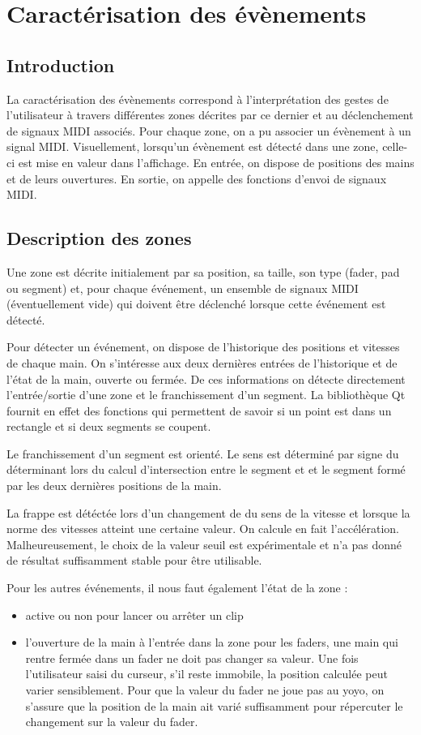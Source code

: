 \section{Caractérisation des évènements}
\subsection{Introduction}
\par La caractérisation des évènements correspond à l'interprétation des gestes de l'utilisateur à travers différentes zones décrites par ce dernier et au déclenchement de signaux MIDI associés. Pour chaque zone, on a pu associer un évènement à un signal MIDI. Visuellement, lorsqu'un évènement est détecté dans une zone, celle-ci est mise en valeur dans l'affichage. En entrée, on dispose de positions des mains et de leurs ouvertures. En sortie, on appelle des fonctions d'envoi de signaux MIDI.
\subsection{Description des zones}
\par  Une zone est décrite initialement par sa position, sa taille, son type  (fader, pad ou segment) et, pour chaque événement, un ensemble de  signaux MIDI (éventuellement vide) qui doivent être déclenché lorsque cette événement est détecté.
\par  Pour détecter un événement, on dispose de l'historique des positions et vitesses de chaque main. On s'intéresse aux deux dernières entrées de l'historique et de l'état de la main, ouverte ou fermée. De ces informations on détecte directement l'entrée/sortie d'une zone et le franchissement d'un segment. La bibliothèque Qt fournit en effet des fonctions qui permettent de savoir si un point est dans un rectangle et si deux segments se coupent.
\par Le franchissement d'un segment est orienté. Le sens est déterminé par signe du déterminant lors du calcul d'intersection entre le segment et et le segment formé par les deux dernières positions de la main. 
\par La frappe est détéctée lors d'un changement de du sens de la vitesse et lorsque la norme des vitesses atteint une certaine valeur. On calcule en fait l'accélération. Malheureusement, le choix de la valeur seuil est expérimentale et n'a pas donné de résultat suffisamment stable pour être utilisable.
\par Pour les autres événements, il nous faut  également l'état de la zone :
\begin{itemize}
    \item active ou non pour lancer ou arrêter un clip
    \item l'ouverture de la main à l'entrée dans la zone pour les faders,  une main qui rentre fermée dans un fader ne doit pas changer sa valeur. Une fois l'utilisateur saisi du curseur, s'il reste immobile, la position calculée peut varier sensiblement. Pour que la valeur du fader ne joue pas au yoyo, on s'assure que la position de la main ait varié suffisamment pour répercuter le changement sur la valeur du fader.
\end{itemize}
